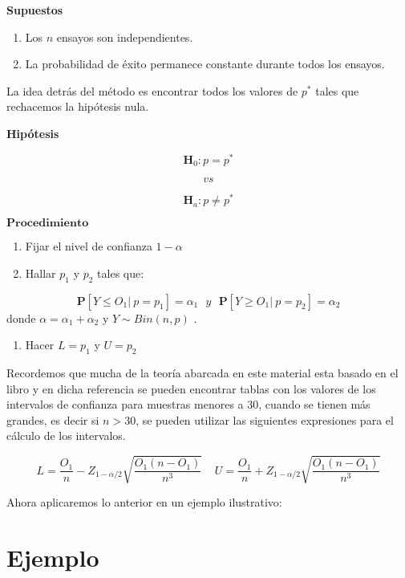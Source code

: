 \documentclass[
  a4paper,
  oneside,
  openany]{book}
\providecommand{\tightlist}{%
  \setlength{\itemsep}{0pt}\setlength{\parskip}{0pt}}
\begin{document}
\textbf{Supuestos}

\begin{enumerate}
\def\labelenumi{\arabic{enumi})}
\item
  Los \(n\) ensayos son independientes.
\item
  La probabilidad de éxito permanece constante durante todos los ensayos.
\end{enumerate}

La idea detrás del método es encontrar todos los valores de \(p^*\) tales que rechacemos la hipótesis nula.

\textbf{Hipótesis}

\[\textbf{H}_{0}: p = p^*\]

\[vs\]

\[\textbf{H}_{a}: p \neq p^*\]

\(\mathbf{Procedimiento}\)

\begin{enumerate}
\def\labelenumi{\arabic{enumi})}
\item
  Fijar el nivel de confianza \(1-\alpha\)
\item
  Hallar \(p_{1}\) y \(p_{2}\) tales que:
\end{enumerate}

\[\mathbf{P}[Y\leq O_{1}| \ p=p_{1}]= \alpha_{1} \ \ \ y \ \ \ \mathbf{P}[Y\geq O_{1}| \ p=p_{2}]= \alpha_{2} \]
donde \(\alpha=\alpha_{1}+\alpha_{2}\) y \(Y \sim Bin (n,p)\) .

\begin{enumerate}
\def\labelenumi{\arabic{enumi})}
\setcounter{enumi}{2}
\tightlist
\item
  Hacer \(L= p_{1}\) y \(U=p_{2}\)
\end{enumerate}

Recordemos que mucha de la teoría abarcada en este material esta basado en el libro \citet{conover1998practical} y en dicha referencia se pueden encontrar tablas con los valores de los intervalos de confianza para muestras menores a 30, cuando se tienen más grandes, es decir si \(n>30\), se pueden utilizar las siguientes expresiones para el cálculo de los intervalos.

\[L=\frac{O_{1}}{n}-Z_{1-\alpha/2}\sqrt{\frac{O_{1}(n-O_{1})}{n^3}} \ \ \ \ \  U=\frac{O_{1}}{n}+Z_{1-\alpha/2}\sqrt{\frac{O_{1}(n-O_{1})}{n^3}}\]

Ahora aplicaremos lo anterior en un ejemplo ilustrativo:

\hypertarget{ejemplo}{%
\section{Ejemplo}\label{ejemplo}}
\end{document}
